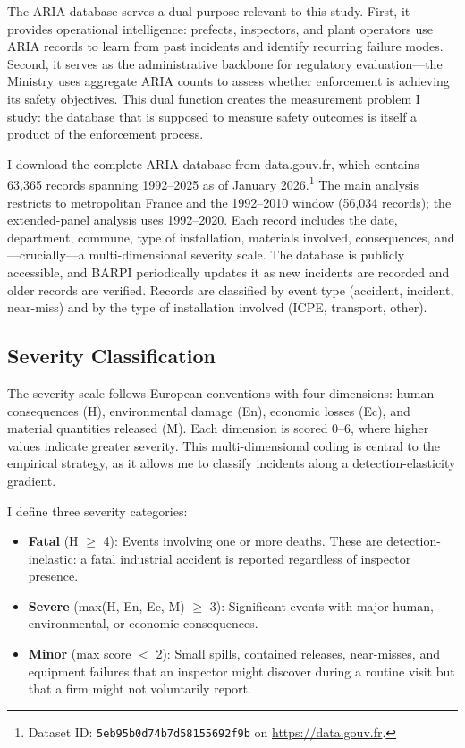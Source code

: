 \documentclass[12pt]{article}
\begin{document}
The ARIA database serves a dual purpose relevant to this study. First, it provides operational intelligence: prefects, inspectors, and plant operators use ARIA records to learn from past incidents and identify recurring failure modes. Second, it serves as the administrative backbone for regulatory evaluation---the Ministry uses aggregate ARIA counts to assess whether enforcement is achieving its safety objectives. This dual function creates the measurement problem I study: the database that is supposed to measure safety outcomes is itself a product of the enforcement process.

I download the complete ARIA database from data.gouv.fr, which contains 63,365 records spanning 1992--2025 as of January 2026.\footnote{Dataset ID: \texttt{5eb95b0d74b7d58155692f9b} on \url{https://data.gouv.fr}.} The main analysis restricts to metropolitan France and the 1992--2010 window (56,034 records); the extended-panel analysis uses 1992--2020. Each record includes the date, department, commune, type of installation, materials involved, consequences, and---crucially---a multi-dimensional severity scale. The database is publicly accessible, and BARPI periodically updates it as new incidents are recorded and older records are verified. Records are classified by event type (accident, incident, near-miss) and by the type of installation involved (ICPE, transport, other).

\subsection{Severity Classification}

The severity scale follows European conventions with four dimensions: human consequences (H), environmental damage (En), economic losses (Ec), and material quantities released (M). Each dimension is scored 0--6, where higher values indicate greater severity. This multi-dimensional coding is central to the empirical strategy, as it allows me to classify incidents along a detection-elasticity gradient.

I define three severity categories:

\begin{itemize}
\item \textbf{Fatal} (H $\geq$ 4): Events involving one or more deaths. These are detection-inelastic: a fatal industrial accident is reported regardless of inspector presence.
\item \textbf{Severe} (max(H, En, Ec, M) $\geq$ 3): Significant events with major human, environmental, or economic consequences.
\item \textbf{Minor} (max score $<$ 2): Small spills, contained releases, near-misses, and equipment failures that an inspector might discover during a routine visit but that a firm might not voluntarily report.
\end{itemize}
\end{document}
